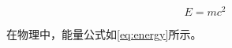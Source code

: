 \documentclass{article}
\begin{document}
 
\begin{equation}
E = mc^2
\label{eq:energy}
\end{equation}
 
在物理中，能量公式如\ref{eq:energy}所示。
 
\end{document}
